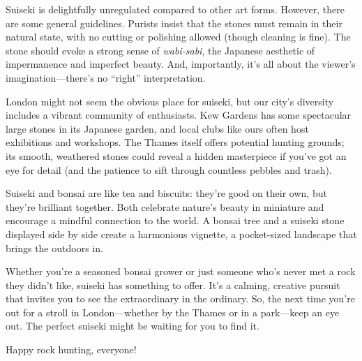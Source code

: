 \vspace*{-0.5em}
\noindent
Suiseki is delightfully unregulated compared to other art forms. 
However, there are some general guidelines. 
Purists insist that the stones must remain in their natural state, with no cutting or polishing allowed (though cleaning is fine). 
The stone should evoke a strong sense of \textit{wabi\--sabi}, the Japanese aesthetic of impermanence and imperfect beauty. 
And, importantly, it's all about the viewer's imagination---there's no ``right'' interpretation.

\noindent
London might not seem the obvious place for suiseki, but our city's diversity includes a vibrant community of enthusiasts.
Kew Gardens has some spectacular large stones in its Japanese garden, and local clubs like ours often host exhibitions and workshops.
The Thames itself offers potential hunting grounds; its smooth, weathered stones could reveal a hidden masterpiece if you've got an eye for detail (and the patience to sift through countless pebbles and trash).

\noindent
Suiseki and bonsai are like tea and biscuits: they're good on their own, but they're brilliant together.
Both celebrate nature's beauty in miniature and encourage a mindful connection to the world.
A bonsai tree and a suiseki stone displayed side by side create a harmonious vignette, a pocket\--sized landscape that brings the outdoors in.

\noindent
Whether you're a seasoned bonsai grower or just someone who's never met a rock they didn't like, suiseki has something to offer.
It's a calming, creative pursuit that invites you to see the extraordinary in the ordinary.
So, the next time you're out for a stroll in London---whether by the Thames or in a park---keep an eye out.
The perfect suiseki might be waiting for you to find it.

Happy rock hunting, everyone!

\closearticle
